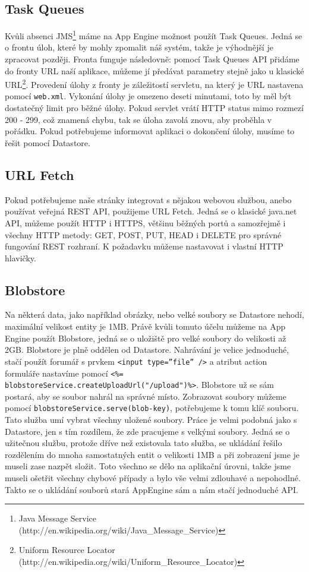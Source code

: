 \subsection{Task Queues}
Kvůli absenci JMS\footnote{Java Message Service (http://en.wikipedia.org/wiki/Java\_Message\_Service)} máme na App Engine možnost použít Task Queues. Jedná se o frontu úloh, které by mohly zpomalit náš systém, takže je výhodnější je zpracovat později. Fronta funguje následovně: pomocí Task Queues API přidáme do fronty URL naší aplikace, můžeme jí předávat parametry stejně jako u klasické URL\footnote{Uniform Resource Locator (http://en.wikipedia.org/wiki/Uniform\_Resource\_Locator)}. Provedení úlohy z fronty je záležitostí servletu, na který je URL nastavena pomocí \verb|web.xml|. Vykonání úlohy je omezeno deseti minutami, toto by měl být dostatečný limit pro běžné úlohy. Pokud servlet vrátí HTTP status mimo rozmezí 200 - 299, což znamená chybu, tak se úloha zavolá znovu, aby proběhla v pořádku. Pokud potřebujeme informovat aplikaci o dokončení úlohy, musíme to řešit pomocí Datastore.

\subsection{URL Fetch}
Pokud potřebujeme naše stránky integrovat s nějakou webovou službou, anebo používat veřejná REST API, použijeme URL Fetch. Jedná se o klasické java.net API, můžeme použít HTTP i HTTPS, většinu běžných portů a samozřejmě i všechny HTTP metody: GET, POST, PUT, HEAD i DELETE pro správné fungování REST rozhraní. K požadavku můžeme nastavovat i vlastní HTTP hlavičky.

\subsection{Blobstore}
Na některá data, jako například obrázky, nebo velké soubory se Datastore nehodí, maximální velikost entity je 1MB. Právě kvůli tomuto účelu můžeme na App Engine použít Blobstore, jedná se o uložiště pro velké soubory do velikosti až 2GB. Blobstore je plně oddělen od Datastore. Nahrávání je velice jednoduché, stačí použít forumář s prvkem \verb|<input type=”file” />| a atribut action formuláře nastavíme pomocí \verb|<%= blobstoreService.createUploadUrl("/upload")%>|.
Blobstore už se sám postará, aby se soubor nahrál na správné místo. Zobrazovat soubory můžeme pomocí \verb|blobstoreService.serve(blob-key)|, potřebujeme k tomu klíč souboru. Tato služba umí vybrat všechny uložené soubory. Práce je velmi podobná jako s Datastore, jen s tím rozdílem, že zde pracujeme s velkými soubory. Jedná se o užitečnou službu, protože dříve než existovala tato služba, se ukládání řešilo rozdělením do mnoha samostatných entit o velikosti 1MB a při zobrazení jsme je museli zase nazpět složit. Toto všechno se dělo na aplikační úrovni, takže jsme museli ošetřit všechny chybové případy a bylo vše velmi zdlouhavé a nepohodlné. Takto se o ukládání souborů stará AppEngine sám a nám stačí jednoduché API.


